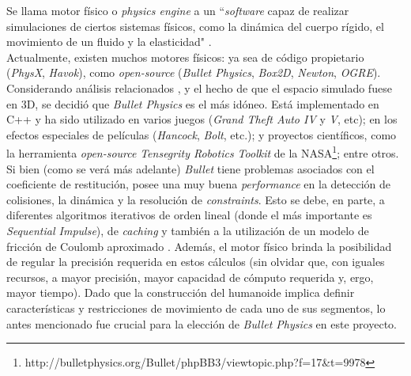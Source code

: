 \documentclass{article}
\begin{document}
Se llama motor f\'isico o \textit{physics engine} a un  ``\textit{software} capaz de realizar simulaciones de ciertos sistemas f\'isicos, como la din\'amica del cuerpo r\'igido, el movimiento de un fluido y la elasticidad" \cite{wikiPhysicsEngine}. \\
Actualmente, existen muchos motores f\'isicos: ya sea de c\'odigo propietario (\textit{PhysX}, \textit{Havok}), como \textit{open-source} (\textit{Bullet Physics}, \textit{Box2D}, \textit{Newton}, \textit{OGRE}). Considerando an\'alisis relacionados \cite{Comparissons}\cite{Comparissons2}, y el hecho de que el espacio simulado fuese en 3D, se decidi\'o que \textit{Bullet Physics}\cite{LinkBullet} es el m\'as id\'oneo. Est\'a implementado en C++ y ha sido utilizado en varios juegos (\textit{Grand Theft Auto IV} y \textit{V}, etc); en los efectos especiales de pel\'iculas (\textit{Hancock}, \textit{Bolt}, etc.); y proyectos cient\'ificos, como la herramienta \textit{open-source} \textit{Tensegrity Robotics Toolkit} de la NASA\footnote{http://bulletphysics.org/Bullet/phpBB3/viewtopic.php?f=17\&t=9978}; entre otros.\\
Si bien (como se ver\'a m\'as adelante) \textit{Bullet} tiene problemas asociados con el coeficiente de restituci\'on, posee una muy buena \textit{performance} en la detecci\'on de colisiones, la din\'amica y la resoluci\'on de \textit{constraints}. Esto se debe, en parte, a diferentes algoritmos iterativos de orden lineal (donde el m\'as importante es \textit{Sequential Impulse}), de \textit{caching} y tambi\'en a la utilizaci\'on de un modelo de fricci\'on de Coulomb aproximado \cite{Catto}. Adem\'as, el motor f\'isico brinda la posibilidad de regular la precisi\'on requerida en estos c\'alculos (sin olvidar que, con iguales recursos, a mayor precisi\'on, mayor capacidad de c\'omputo requerida y, ergo, mayor tiempo). Dado que la construcci\'on del humanoide implica definir caracter\'isticas y restricciones de movimiento de cada uno de sus segmentos, lo antes mencionado fue crucial para la elecci\'on de \textit{Bullet Physics} en este proyecto.
\end{document}
